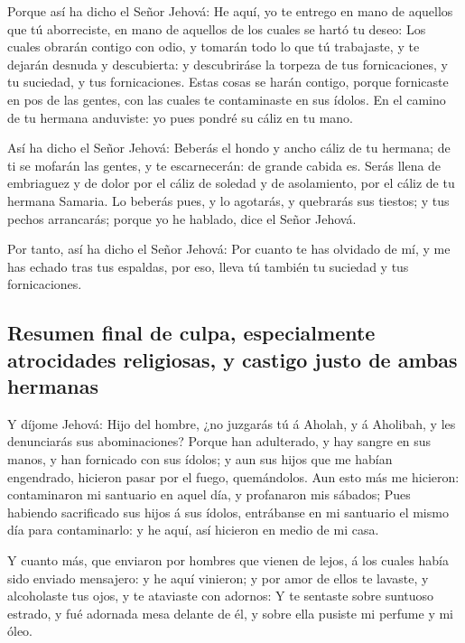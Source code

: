  Porque así ha dicho el Señor Jehová: He aquí, yo te
entrego en mano de aquellos que tú aborreciste, en mano de aquellos de
los cuales se hartó tu deseo:  Los cuales obrarán contigo
con odio, y tomarán todo lo que tú trabajaste, y te dejarán desnuda y
descubierta: y descubriráse la torpeza de tus fornicaciones, y tu
suciedad, y tus fornicaciones.  Estas cosas se harán
contigo, porque fornicaste en pos de las gentes, con las cuales te
contaminaste en sus ídolos.  En el camino de tu hermana
anduviste: yo pues pondré su cáliz en tu mano.

 Así ha dicho el Señor Jehová: Beberás el hondo y ancho
cáliz de tu hermana; de ti se mofarán las gentes, y te escarnecerán: de
grande cabida es.  Serás llena de embriaguez y de dolor
por el cáliz de soledad y de asolamiento, por el cáliz de tu hermana
Samaria.  Lo beberás pues, y lo agotarás, y quebrarás sus
tiestos; y tus pechos arrancarás; porque yo he hablado, dice el Señor
Jehová.

 Por tanto, así ha dicho el Señor Jehová: Por cuanto te
has olvidado de mí, y me has echado tras tus espaldas, por eso, lleva tú
también tu suciedad y tus fornicaciones.

\hypertarget{resumen-final-de-culpa-especialmente-atrocidades-religiosas-y-castigo-justo-de-ambas-hermanas}{%
\subsection{Resumen final de culpa, especialmente atrocidades
religiosas, y castigo justo de ambas
hermanas}\label{resumen-final-de-culpa-especialmente-atrocidades-religiosas-y-castigo-justo-de-ambas-hermanas}}

 Y díjome Jehová: Hijo del hombre, ¿no juzgarás tú á
Aholah, y á Aholibah, y les denunciarás sus abominaciones?
 Porque han adulterado, y hay sangre en sus manos, y han
fornicado con sus ídolos; y aun sus hijos que me habían engendrado,
hicieron pasar por el fuego, quemándolos.  Aun esto más
me hicieron: contaminaron mi santuario en aquel día, y profanaron mis
sábados;  Pues habiendo sacrificado sus hijos á sus
ídolos, entrábanse en mi santuario el mismo día para contaminarlo: y he
aquí, así hicieron en medio de mi casa.

 Y cuanto más, que enviaron por hombres que vienen de
lejos, á los cuales había sido enviado mensajero: y he aquí vinieron; y
por amor de ellos te lavaste, y alcoholaste tus ojos, y te ataviaste con
adornos:  Y te sentaste sobre suntuoso estrado, y fué
adornada mesa delante de él, y sobre ella pusiste mi perfume y mi óleo.

